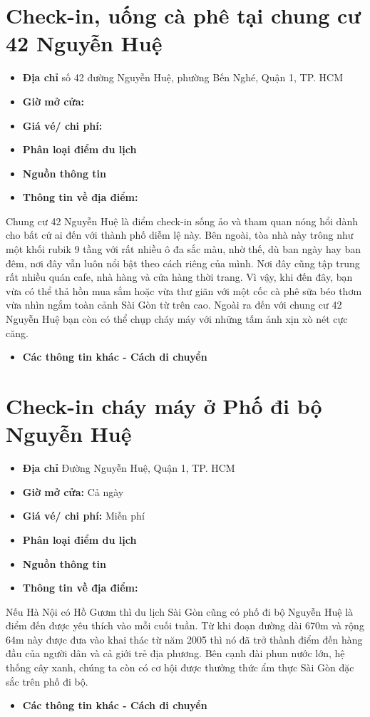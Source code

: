 \documentclass{article}
\begin{document}
\section{Check-in, uống cà phê tại chung cư 42 Nguyễn Huệ}
\begin{itemize}
    \item{\textbf{Địa chỉ}} số 42 đường Nguyễn Huệ, phường Bến Nghé, Quận 1, TP. HCM
    \item{\textbf{Giờ mở cửa:}}
    \item{\textbf{Giá vé/ chi phí:}}
    \item{\textbf{Phân loại điểm du lịch} }
    \item{\textbf{Nguồn thông tin}}
    \item{\textbf{Thông tin về địa điểm:}}
\end{itemize}
Chung cư 42 Nguyễn Huệ là điểm check-in sống ảo và tham quan nóng hổi dành cho bất cứ ai đến với thành phố diễm lệ này. Bên ngoài, tòa nhà này trông như một khối rubik 9 tầng với rất nhiều ô đa sắc màu, nhờ thế, dù ban ngày hay ban đêm, nơi đây vẫn luôn nổi bật theo cách riêng của mình. Nơi đây cũng tập trung rất nhiều quán cafe, nhà hàng và cửa hàng thời trang. Vì vậy, khi đến đây, bạn vừa có thể thả hồn mua sắm hoặc vừa thư giãn với một cốc cà phê sữa béo thơm vừa nhìn ngắm toàn cảnh Sài Gòn từ trên cao. Ngoài ra đến với chung cư 42 Nguyễn Huệ bạn còn có thể chụp cháy máy với những tấm ảnh xịn xò nét cực căng.
\begin{itemize}
    \item{\textbf{Các thông tin khác - Cách di chuyển}}
\end{itemize}

\section{Check-in cháy máy ở Phố đi bộ Nguyễn Huệ}
\begin{itemize}
    \item{\textbf{Địa chỉ}} Đường Nguyễn Huệ, Quận 1, TP. HCM
    \item{\textbf{Giờ mở cửa:}} Cả ngày
    \item{\textbf{Giá vé/ chi phí:}} Miễn phí
    \item{\textbf{Phân loại điểm du lịch} }
    \item{\textbf{Nguồn thông tin}}
    \item{\textbf{Thông tin về địa điểm:}}
\end{itemize}
Nếu Hà Nội có Hồ Gươm thì du lịch Sài Gòn cũng có phố đi bộ Nguyễn Huệ là điểm đến được yêu thích vào mỗi cuối tuần. Từ khi đoạn đường dài 670m và rộng 64m này được đưa vào khai thác từ năm 2005 thì nó đã trở thành điểm đến hàng đầu của người dân và cả giới trẻ địa phương. Bên cạnh đài phun nước lớn, hệ thống cây xanh, chúng ta còn có cơ hội được thưởng thức ẩm thực Sài Gòn đặc sắc trên phố đi bộ.
\begin{itemize}
    \item{\textbf{Các thông tin khác - Cách di chuyển}}
\end{itemize}
\end{document}
